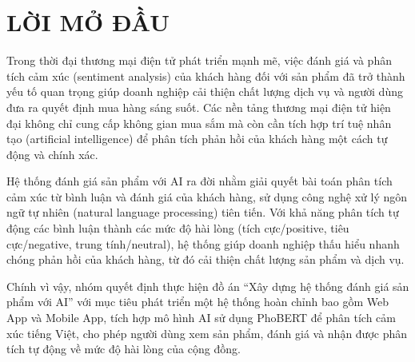 
\newpage



\section*{\textbf{LỜI MỞ ĐẦU}}
{}
Trong thời đại thương mại điện tử phát triển mạnh mẽ, việc đánh giá và phân tích cảm xúc (sentiment analysis) của khách hàng đối với sản phẩm đã trở thành yếu tố quan trọng giúp doanh nghiệp cải thiện chất lượng dịch vụ và người dùng đưa ra quyết định mua hàng sáng suốt. Các nền tảng thương mại điện tử hiện đại không chỉ cung cấp không gian mua sắm mà còn cần tích hợp trí tuệ nhân tạo (artificial intelligence) để phân tích phản hồi của khách hàng một cách tự động và chính xác.

Hệ thống đánh giá sản phẩm với AI ra đời nhằm giải quyết bài toán phân tích cảm xúc từ bình luận và đánh giá của khách hàng, sử dụng công nghệ xử lý ngôn ngữ tự nhiên (natural language processing) tiên tiến. Với khả năng phân tích tự động các bình luận thành các mức độ hài lòng (tích cực/positive, tiêu cực/negative, trung tính/neutral), hệ thống giúp doanh nghiệp thấu hiểu nhanh chóng phản hồi của khách hàng, từ đó cải thiện chất lượng sản phẩm và dịch vụ.

Chính vì vậy, nhóm quyết định thực hiện đồ án “Xây dựng hệ thống đánh giá sản phẩm với AI” với mục tiêu phát triển một hệ thống hoàn chỉnh bao gồm Web App và Mobile App, tích hợp mô hình AI sử dụng PhoBERT để phân tích cảm xúc tiếng Việt, cho phép người dùng xem sản phẩm, đánh giá và nhận được phân tích tự động về mức độ hài lòng của cộng đồng.